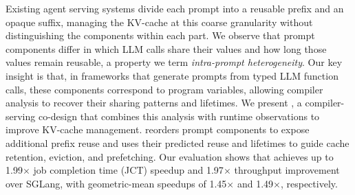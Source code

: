 Existing agent serving systems divide each prompt into a reusable prefix and an opaque suffix, managing the KV-cache at this coarse granularity without distinguishing the components within each part. We observe that prompt components differ in which LLM calls share their values and how long those values remain reusable, a property we term \textit{intra-prompt heterogeneity}. Our key insight is that, in frameworks that generate prompts from typed LLM function calls, these components correspond to program variables, allowing compiler analysis to recover their sharing patterns and lifetimes. We present \sysname, a compiler-serving co-design that combines this analysis with runtime observations to improve KV-cache management. \sysname reorders prompt components to expose additional prefix reuse and uses their predicted reuse and lifetimes to guide cache retention, eviction, and prefetching. Our evaluation shows that \sysname achieves up to 1.99$\times$ job completion time (JCT) speedup and 1.97$\times$ throughput improvement over SGLang, with geometric-mean speedups of 1.45$\times$ and 1.49$\times$, respectively.